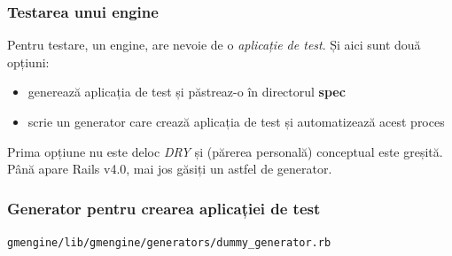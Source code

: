 \documentclass[compress]{beamer}
\begin{document}
\begin{frame}
\frametitle{Testarea unui engine}

Pentru testare, un engine, are nevoie de o \emph{aplicație de test}.
Și aici sunt două opțiuni:
\begin{itemize}
  \item generează aplicația de test și păstreaz-o în directorul \textbf{spec}
  \item scrie un generator care crează aplicația de test și automatizează acest proces
\end{itemize}

Prima opțiune nu este deloc \emph{DRY} și (părerea personală) conceptual este greșită.
Până apare Rails v4.0, mai jos găsiți un astfel de generator.
\end{frame}

\begin{frame}
\frametitle{Generator pentru crearea aplicației de test}

\texttt{gmengine/lib/gmengine/generators/dummy\_generator.rb}
\inputminted[fontsize=\tiny,gobble=0,linenos=true,firstline=0,lastline=0]{ruby}{code/gmengine/lib/gmengine/generators/dummy_generator.rb}
\end{frame}
\end{document}
